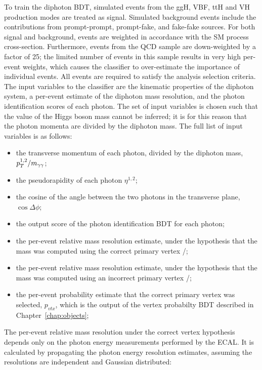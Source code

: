 To train the diphoton BDT, simulated events from the ggH, VBF, ttH 
and VH production modes are treated as signal. 
Simulated background events include the contributions from prompt-prompt, prompt-fake, 
and fake-fake sources.
For both signal and background, 
events are weighted in accordance with the SM process cross-section.
Furthermore, events from the QCD sample are down-weighted by a factor of 25;
the limited number of events in this sample results in very high per-event weights, 
which causes the classifier to over-estimate the importance of individual events.
All events are required to satisfy the analysis selection criteria.
The input variables to the classifier are the kinematic properties of the diphoton system, 
a per-event estimate of the diphoton mass resolution, 
and the photon identification scores of each photon.
The set of input variables is chosen such that the value of the Higgs boson mass cannot be inferred;
it is for this reason that the photon momenta are divided by the diphoton mass.
The full list of input variables is as follows:
\begin{itemize}
\item the transverse momentum of each photon, divided by the diphoton mass, $p_T^{1,2}/m_{\gamma\gamma}$;
\item the pseudorapidity of each photon $\eta^{1,2}$;
\item the cosine of the angle between the two photons in the transverse plane, $\cos{\Delta\phi}$;
\item the output score of the photon identification BDT for each photon;
\item the per-event relative mass resolution estimate, 
      under the hypothesis that the mass was computed using the correct primary vertex \srv/\mgg;
\item the per-event relative mass resolution estimate, 
      under the hypothesis that the mass was computed using an incorrect primary vertex \swv/\mgg;
\item the per-event probability estimate that the correct primary vertex was selected, $p_{vtx}$,
      which is the output of the vertex probabilty BDT described in Chapter~\ref{chap:objects};
\end{itemize}

The per-event relative mass resolution under the correct vertex hypothesis 
depends only on the photon energy measurements performed by the ECAL.
It is calculated by propagating the photon energy resolution estimates, 
assuming the resolutions are independent and Gaussian distributed:

